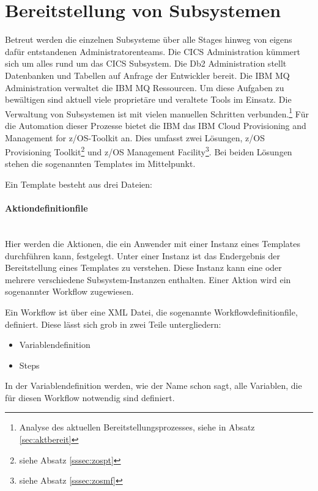 \section{Bereitstellung von Subsystemen}
Betreut werden die einzelnen Subsysteme über alle Stages hinweg von eigens dafür entstandenen Administratorenteams.
Die \glqq CICS Administration\grqq{} kümmert sich um alles rund um das CICS Subsystem.
Die \glqq Db2 Administration\grqq{} stellt Datenbanken und Tabellen auf Anfrage der Entwickler bereit.
Die \glqq IBM MQ Administration\grqq{} verwaltet die IBM MQ Ressourcen.
Um diese Aufgaben zu bewältigen sind aktuell viele proprietäre und veraltete Tools im Einsatz.
Die Verwaltung von Subsystemen ist mit vielen manuellen Schritten verbunden.\footnote{Analyse des aktuellen Bereitstellungsprozesses, siehe in Absatz \ref{sec:aktbereit}}
Für die Automation dieser Prozesse bietet die IBM das \glqq IBM Cloud Provisioning and Management for z/OS\grqq-Toolkit an.
Dies umfasst zwei Lösungen, \glqq z/OS Provisioning Toolkit\grqq\footnote{siehe Absatz \ref{sssec:zospt}} und \glqq z/OS Management Facility\grqq\footnote{siehe Absatz \ref{sssec:zosmf}}.
Bei beiden Lösungen stehen die sogenannten \glqq Templates\grqq{} im Mittelpunkt.

Ein Template besteht aus drei Dateien:

\paragraph{\glqq Aktiondefinitionfile\grqq} ~\\
Hier werden die Aktionen, die ein Anwender mit einer Instanz eines Templates durchführen kann, festgelegt.
Unter einer Instanz ist das Endergebnis der Bereitstellung eines Templates zu verstehen.
Diese Instanz kann eine oder mehrere verschiedene Subsystem-Instanzen enthalten.
Einer Aktion wird ein sogenannter \glqq Workflow\grqq{} zugewiesen.

Ein Workflow ist über eine XML Datei, die sogenannte \glqq Workflowdefinitionfile\grqq, definiert.
Diese lässt sich grob in zwei Teile untergliedern:
\begin{itemize}
\item Variablendefinition
\item Steps
\end{itemize}
In der Variablendefinition werden, wie der Name schon sagt, alle Variablen, die für diesen Workflow notwendig sind definiert.

